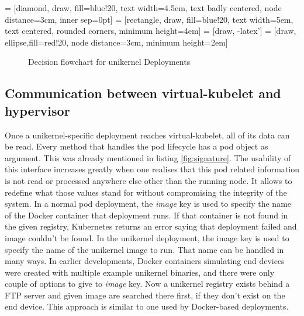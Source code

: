  = [diamond, draw, fill=blue!20, 
    text width=4.5em, text badly centered, node distance=3cm, inner sep=0pt]
 = [rectangle, draw, fill=blue!20, 
    text width=5em, text centered, rounded corners, minimum height=4em]
 = [draw, -latex']
 = [draw, ellipse,fill=red!20, node distance=3cm,
    minimum height=2em]
  \begin{figure}[!h]
    \centering
{}
\caption{Decision flowchart for unikernel Deployments}
\label{fig:deployment-flowchart}
\end{figure}
\subsection{Communication between virtual-kubelet and hypervisor}
Once a unikernel-specific deployment reaches virtual-kubelet, all of its data can be read. Every method that handles the pod lifecycle has a pod object as argument. This was already mentioned in listing \ref{fig:signature}. The usability of this interface increases greatly when one realises that this pod related information is not read or processed anywhere else other than the running node. It allows to redefine what those values stand for without compromising the integrity of the system. In a normal pod deployment, the \textit{image} key is used to specify the name of the Docker container that deployment runs. If that container is not found in the given registry, Kubernetes returns an error saying that deployment failed and image couldn't be found. In the unikernel deployment, the image key is used to specify the name of the unikernel image to run. That name can be handled in many ways. In earlier developments, Docker containers simulating end devices were created with multiple example unikernel binaries, and there were only couple of options to give to \textit{image} key. Now a unikernel registry exists behind a FTP server and given image are searched there first, if they don't exist on the end device. This approach is similar to one used by Docker-based deployments.

